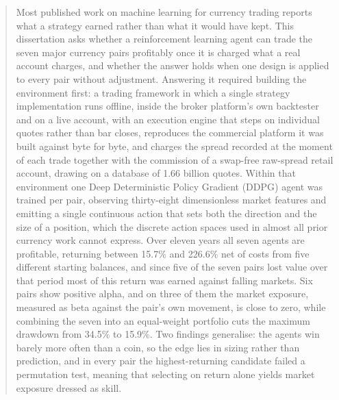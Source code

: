 \begin{abstract}

Most published work on machine learning for currency trading reports what a strategy earned rather than what it would have kept. This dissertation asks whether a reinforcement learning agent can trade the seven major currency pairs profitably once it is charged what a real account charges, and whether the answer holds when one design is applied to every pair without adjustment. Answering it required building the environment first: a trading framework in which a single strategy implementation runs offline, inside the broker platform's own backtester and on a live account, with an execution engine that steps on individual quotes rather than bar closes, reproduces the commercial platform it was built against byte for byte, and charges the spread recorded at the moment of each trade together with the commission of a swap-free raw-spread retail account, drawing on a database of 1.66 billion quotes. Within that environment one Deep Deterministic Policy Gradient (DDPG) agent was trained per pair, observing thirty-eight dimensionless market features and emitting a single continuous action that sets both the direction and the size of a position, which the discrete action spaces used in almost all prior currency work cannot express. Over eleven years all seven agents are profitable, returning between 15.7\% and 226.6\% net of costs from five different starting balances, and since five of the seven pairs lost value over that period most of this return was earned against falling markets. Six pairs show positive alpha, and on three of them the market exposure, measured as beta against the pair's own movement, is close to zero, while combining the seven into an equal-weight portfolio cuts the maximum drawdown from 34.5\% to 15.9\%. Two findings generalise: the agents win barely more often than a coin, so the edge lies in sizing rather than prediction, and in every pair the highest-returning candidate failed a permutation test, meaning that selecting on return alone yields market exposure dressed as skill.
\clearpage
\end{abstract}